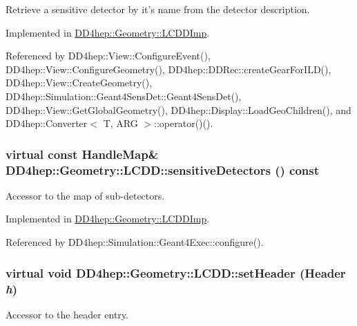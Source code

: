 Retrieve a sensitive detector by it's name from the detector description. 

Implemented in \hyperlink{class_d_d4hep_1_1_geometry_1_1_l_c_d_d_imp_ac67b0ebe0d7ccb694c0d7a9e53cb4662}{DD4hep::Geometry::LCDDImp}.

Referenced by DD4hep::View::ConfigureEvent(), DD4hep::View::ConfigureGeometry(), DD4hep::DDRec::createGearForILD(), DD4hep::View::CreateGeometry(), DD4hep::Simulation::Geant4SensDet::Geant4SensDet(), DD4hep::View::GetGlobalGeometry(), DD4hep::Display::LoadGeoChildren(), and DD4hep::Converter$<$ T, ARG $>$::operator()().\hypertarget{class_d_d4hep_1_1_geometry_1_1_l_c_d_d_a576c24cc18698eb14658466999fca65d}{
\subsubsection[{sensitiveDetectors}]{\setlength{\rightskip}{0pt plus 5cm}virtual const {\bf HandleMap}\& DD4hep::Geometry::LCDD::sensitiveDetectors () const}}
\label{class_d_d4hep_1_1_geometry_1_1_l_c_d_d_a576c24cc18698eb14658466999fca65d}


Accessor to the map of sub-\/detectors. 

Implemented in \hyperlink{class_d_d4hep_1_1_geometry_1_1_l_c_d_d_imp_a493e9d19391553cb1ce589dbc5248904}{DD4hep::Geometry::LCDDImp}.

Referenced by DD4hep::Simulation::Geant4Exec::configure().\hypertarget{class_d_d4hep_1_1_geometry_1_1_l_c_d_d_a9927ac6aeae1dad18e22413deba9aa65}{
\subsubsection[{setHeader}]{\setlength{\rightskip}{0pt plus 5cm}virtual void DD4hep::Geometry::LCDD::setHeader ({\bf Header} {\em h})}}
\label{class_d_d4hep_1_1_geometry_1_1_l_c_d_d_a9927ac6aeae1dad18e22413deba9aa65}


Accessor to the header entry. 

